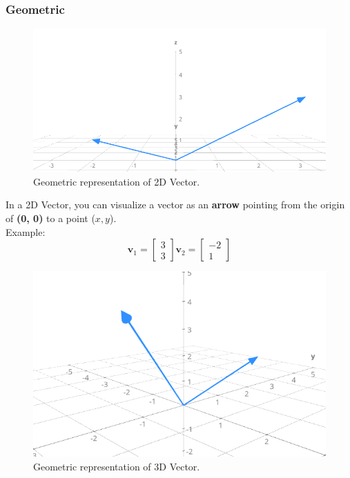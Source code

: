 \documentclass[12pt]{article}
\begin{document}
        \subsubsection{Geometric}
            \begin{figure}[h]
                \centering
                \includegraphics[width=1\textwidth]{examples/1-1.png} 
                \caption{Geometric representation of 2D Vector.}
                \label{fig:1}
            \end{figure}
        
            In a 2D Vector, you can visualize a vector as an \textbf{arrow} pointing from the origin of \textbf{(0, 0)} to a point ($x, y$). \\
            Example:
            \begin{equation}
                \mathbf{v}_1 = \begin{bmatrix} 3 \\ 3 \end{bmatrix}
                \mathbf{v}_2 = \begin{bmatrix} -2 \\ 1 \end{bmatrix}
            \end{equation}
            
            \begin{figure}[H]
                \centering
                \includegraphics[width=1\textwidth]{examples/1-2.png} 
                \caption{Geometric representation of 3D Vector.}
                \label{fig:2}
            \end{figure}
            
\end{document}
